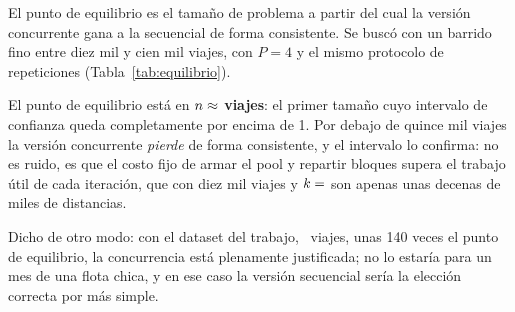 El punto de equilibrio es el tamaño de problema a partir del cual la versión concurrente gana a la
secuencial de forma consistente. Se buscó con un barrido fino entre diez mil y cien mil viajes, con
$P = 4$ y el mismo protocolo de  repeticiones (Tabla~\ref{tab:equilibrio}).



El punto de equilibrio está en \textbf{$n \approx \cifra{n-equilibrio}$ viajes}: el primer tamaño
cuyo intervalo de confianza queda completamente por encima de 1. Por debajo de quince mil viajes la
versión concurrente \emph{pierde} de forma consistente, y el intervalo lo confirma: no es ruido, es
que el costo fijo de armar el pool y repartir bloques supera el trabajo útil de cada iteración, que
con diez mil viajes y $k = \cifra{k}$ son apenas unas decenas de miles de distancias.

Dicho de otro modo: con el dataset del trabajo, ~viajes, unas 140 veces el punto de
equilibrio, la concurrencia está plenamente justificada; no lo estaría para un mes de una flota
chica, y en ese caso la versión secuencial sería la elección correcta por más simple.
